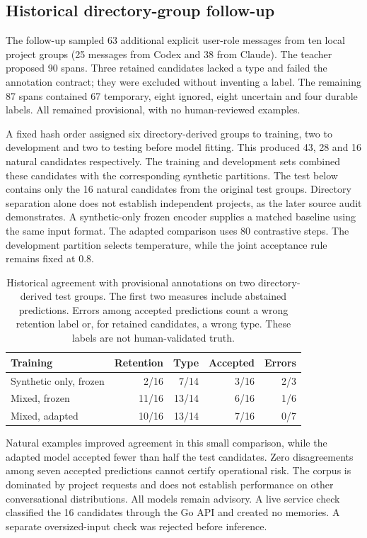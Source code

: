 \subsection{Historical directory-group follow-up}
The follow-up sampled 63 additional explicit user-role messages from ten local project groups (25 messages from Codex and 38 from Claude). The teacher proposed 90 spans. Three retained candidates lacked a type and failed the annotation contract; they were excluded without inventing a label. The remaining 87 spans contained 67 temporary, eight ignored, eight uncertain and four durable labels. All remained provisional, with no human-reviewed examples.

A fixed hash order assigned six directory-derived groups to training, two to development and two to testing before model fitting. This produced 43, 28 and 16 natural candidates respectively. The training and development sets combined these candidates with the corresponding synthetic partitions. The test below contains only the 16 natural candidates from the original test groups. Directory separation alone does not establish independent projects, as the later source audit demonstrates. A synthetic-only frozen encoder supplies a matched baseline using the same input format. The adapted comparison uses 80 contrastive steps. The development partition selects temperature, while the joint acceptance rule remains fixed at 0.8.

\begin{table}[htbp]
\centering
\begin{tabular}{lrrrr}
\toprule
Training & Retention & Type & Accepted & Errors\\
\midrule
Synthetic only, frozen & 2/16 & 7/14 & 3/16 & 2/3\\
Mixed, frozen & 11/16 & 13/14 & 6/16 & 1/6\\
Mixed, adapted & 10/16 & 13/14 & 7/16 & 0/7\\
\bottomrule
\end{tabular}
\caption{Historical agreement with provisional annotations on two directory-derived test groups. The first two measures include abstained predictions. Errors among accepted predictions count a wrong retention label or, for retained candidates, a wrong type. These labels are not human-validated truth.}
\label{tab:natural-followup}
\end{table}

Natural examples improved agreement in this small comparison, while the adapted model accepted fewer than half the test candidates. Zero disagreements among seven accepted predictions cannot certify operational risk. The corpus is dominated by project requests and does not establish performance on other conversational distributions. All models remain advisory. A live service check classified the 16 candidates through the Go API and created no memories. A separate oversized-input check was rejected before inference.

